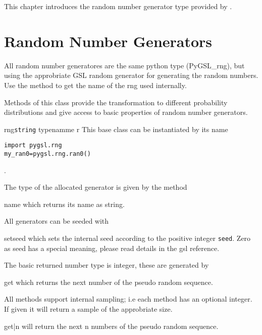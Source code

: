
%
%
%

This chapter introduces the random number generator type provided by .

\section{Random Number Generators}

All random number generatores are the same python type (PyGSL_rng), but using the
approbriate GSL random generator for generating the random numbers. Use the method
 to get the name of the rng used internally.

Methods of
this class  provide the transformation to different probability
distributions and give access to basic properties of random number generators. 

\begin{classdesc}{rng}{\texttt{string} typenamme \code{|}  r}
  This base class can be instantiated by its name
\begin{verbatim}
import pygsl.rng
my_ran0=pygsl.rng.ran0()
\end{verbatim}
.


\end{classdesc}
The type of the allocated generator is given by the method
\begin{methoddesc}{name}{}
  which returns its name as string.
\end{methoddesc}
All generators can be seeded with
\begin{methoddesc}{set}{seed}
  which sets the internal seed according to the positive integer {\tt seed}. Zero as seed
  has a special meaning, please read details in the gsl reference.
\end{methoddesc}
The basic returned number type is integer, these are generated by
\begin{methoddesc}{get}{}
  which returns the next number of the pseudo random sequence.
\end{methoddesc}
All methods support internal sampling; i.e each method has an optional integer. 
If given it will return a sample of the approbriate size.
\begin{methoddesc}{get}{|n}
  will return the next n numbers of the pseudo random sequence.
\end{methoddesc}

